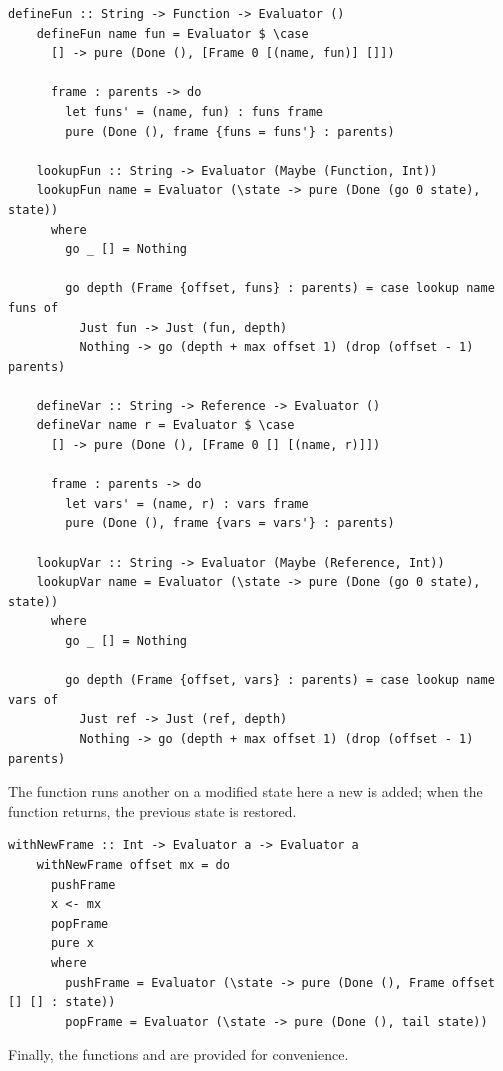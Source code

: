 \documentclass[UdineBachThesis,american,11pt]{PhdThesis}
\begin{document}
  \begin{lstlisting}[gobble=4,basicstyle=\ttfamily\small]
    defineFun :: String -> Function -> Evaluator ()
    defineFun name fun = Evaluator $ \case
      [] -> pure (Done (), [Frame 0 [(name, fun)] []])

      frame : parents -> do
        let funs' = (name, fun) : funs frame
        pure (Done (), frame {funs = funs'} : parents)

    lookupFun :: String -> Evaluator (Maybe (Function, Int))
    lookupFun name = Evaluator (\state -> pure (Done (go 0 state), state))
      where
        go _ [] = Nothing

        go depth (Frame {offset, funs} : parents) = case lookup name funs of
          Just fun -> Just (fun, depth)
          Nothing -> go (depth + max offset 1) (drop (offset - 1) parents)

    defineVar :: String -> Reference -> Evaluator ()
    defineVar name r = Evaluator $ \case
      [] -> pure (Done (), [Frame 0 [] [(name, r)]])

      frame : parents -> do
        let vars' = (name, r) : vars frame
        pure (Done (), frame {vars = vars'} : parents)

    lookupVar :: String -> Evaluator (Maybe (Reference, Int))
    lookupVar name = Evaluator (\state -> pure (Done (go 0 state), state))
      where
        go _ [] = Nothing

        go depth (Frame {offset, vars} : parents) = case lookup name vars of
          Just ref -> Just (ref, depth)
          Nothing -> go (depth + max offset 1) (drop (offset - 1) parents)
  \end{lstlisting}

  The function \lstinline@withNewFrame@ runs another \lstinline@Evaluator@ on
  a modified state here a new \lstinline@Frame@ is added; when the function
  returns, the previous state is restored.

  \begin{lstlisting}[gobble=4,basicstyle=\ttfamily\small]
    withNewFrame :: Int -> Evaluator a -> Evaluator a
    withNewFrame offset mx = do
      pushFrame
      x <- mx
      popFrame
      pure x
      where
        pushFrame = Evaluator (\state -> pure (Done (), Frame offset [] [] : state))
        popFrame = Evaluator (\state -> pure (Done (), tail state))
  \end{lstlisting}

  Finally, the functions \lstinline@breakpoint@ and \lstinline@raise@ are
  provided for convenience.
\end{document}
